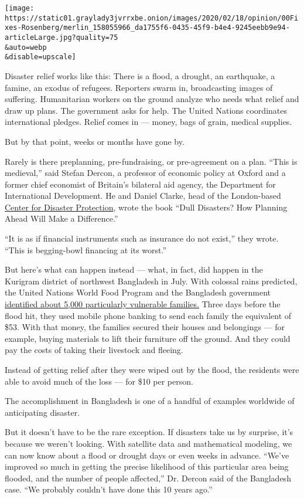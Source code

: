 \texttt{[image: https://static01.graylady3jvrrxbe.onion/images/2020/02/18/opinion/00Fixes-Rosenberg/merlin\_158055966\_da1755f6-0435-45f9-b4e4-9245eebb9e94-articleLarge.jpg?quality=75\\\&auto=webp\\\&disable=upscale]}

Disaster relief works like this: There is a flood, a drought, an
earthquake, a famine, an exodus of refugees. Reporters swarm in,
broadcasting images of suffering. Humanitarian workers on the ground
analyze who needs what relief and draw up plans. The government asks for
help. The United Nations coordinates international pledges. Relief comes
in --- money, bags of grain, medical supplies.

But by that point, weeks or months have gone by.

Rarely is there preplanning, pre-fundraising, or pre-agreement on a
plan. ``This is medieval,'' said Stefan Dercon, a professor of economic
policy at Oxford and a former chief economist of Britain's bilateral aid
agency, the Department for International Development. He and Daniel
Clarke, head of the London-based
\href{https://www.disasterprotection.org/}{Center for Disaster
Protection}, wrote the book ``Dull Disasters? How Planning Ahead Will
Make a Difference.''

``It is as if financial instruments such as insurance do not exist,''
they wrote. ``This is begging-bowl financing at its worst.''

But here's what can happen instead --- what, in fact, did happen in the
Kurigram district of northwest Bangladesh in July. With colossal rains
predicted, the United Nations World Food Program and the Bangladesh
government
\href{https://www.wfp.org/news/wfp-provides-innovative-assistance-flood-affected-people-north-western-bangladesh}{identified
about 5,000 particularly vulnerable families.} Three days before the
flood hit, they used mobile phone banking to send each family the
equivalent of \$53. With that money, the families secured their houses
and belongings --- for example, buying materials to lift their furniture
off the ground. And they could pay the costs of taking their livestock
and fleeing.

Instead of getting relief after they were wiped out by the flood, the
residents were able to avoid much of the loss --- for \$10 per person.

The accomplishment in Bangladesh is one of a handful of examples
worldwide of anticipating disaster.

But it doesn't have to be the rare exception. If disasters take us by
surprise, it's because we weren't looking. With satellite data and
mathematical modeling, we can now know about a flood or drought days or
even weeks in advance. ``We've improved so much in getting the precise
likelihood of this particular area being flooded, and the number of
people affected,'' Dr. Dercon said of the Bangladesh case. ``We probably
couldn't have done this 10 years ago.''

